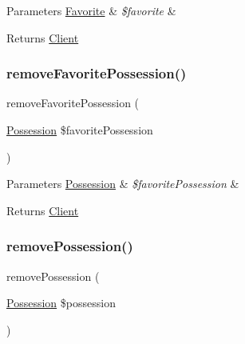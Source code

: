 \begin{DoxyParams}[1]{Parameters}
\mbox{\hyperlink{class_app_1_1_entity_1_1_favorite}{Favorite}} & {\em \$favorite} & \\
\hline
\end{DoxyParams}
\begin{DoxyReturn}{Returns}
\mbox{\hyperlink{class_app_1_1_entity_1_1_client}{Client}} 
\end{DoxyReturn}
\mbox{\label{class_app_1_1_entity_1_1_client_aa5aecc4a8c2b86f04959da66fd968642}} 
\subsubsection{\texorpdfstring{removeFavoritePossession()}{removeFavoritePossession()}}
{\footnotesize\ttfamily remove\+Favorite\+Possession (\begin{DoxyParamCaption}\item[{\mbox{\hyperlink{class_app_1_1_entity_1_1_possession}{Possession}}}]{\$favorite\+Possession }\end{DoxyParamCaption})}


\begin{DoxyParams}[1]{Parameters}
\mbox{\hyperlink{class_app_1_1_entity_1_1_possession}{Possession}} & {\em \$favorite\+Possession} & \\
\hline
\end{DoxyParams}
\begin{DoxyReturn}{Returns}
\mbox{\hyperlink{class_app_1_1_entity_1_1_client}{Client}} 
\end{DoxyReturn}
\mbox{\label{class_app_1_1_entity_1_1_client_a720a2c7cb1ff271659d4ca746e29ca47}} 
\subsubsection{\texorpdfstring{removePossession()}{removePossession()}}
{\footnotesize\ttfamily remove\+Possession (\begin{DoxyParamCaption}\item[{\mbox{\hyperlink{class_app_1_1_entity_1_1_possession}{Possession}}}]{\$possession }\end{DoxyParamCaption})}


